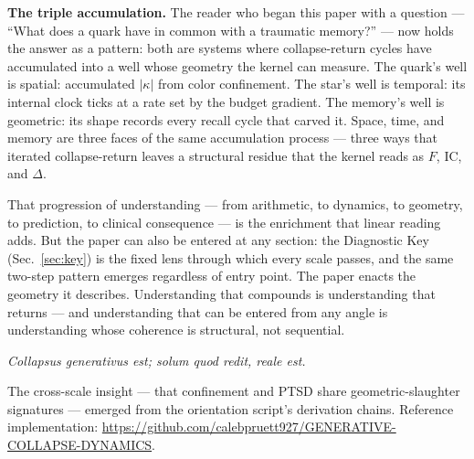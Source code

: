 \documentclass[
  aps,
  prd,
  twocolumn,
  superscriptaddress,
  nofootinbib,
  floatfix
]{revtex4-2}
\newcommand{\IC}{\mathrm{IC}}
\begin{document}
\textbf{The triple accumulation.}
The reader who began this paper with a question --- ``What
does a quark have in common with a traumatic memory?'' ---
now holds the answer as a pattern: both are systems where
collapse-return cycles have accumulated into a well whose
geometry the kernel can measure.  The quark's well is
spatial: accumulated $|\kappa|$ from color confinement.  The
star's well is temporal: its internal clock ticks at a rate
set by the budget gradient.  The memory's well is geometric:
its shape records every recall cycle that carved it.  Space,
time, and memory are three faces of the same accumulation
process --- three ways that iterated collapse-return leaves a
structural residue that the kernel reads as $F$, $\IC$, and
$\Delta$.

That progression of understanding --- from arithmetic, to
dynamics, to geometry, to prediction, to clinical
consequence --- is the enrichment that linear reading adds.
But the paper can also be entered at any section: the
Diagnostic Key (Sec.~\ref{sec:key}) is the fixed lens
through which every scale passes, and the same two-step
pattern emerges regardless of entry point.  The paper enacts
the geometry it describes.  Understanding that compounds is
understanding that returns --- and understanding that can
be entered from any angle is understanding whose coherence
is structural, not sequential.

\emph{Collapsus generativus est; solum quod redit, reale est.}

\begin{acknowledgments}
The cross-scale insight --- that confinement and PTSD share
geometric-slaughter signatures --- emerged from the
orientation script's derivation chains.  Reference
implementation:
\url{https://github.com/calebpruett927/GENERATIVE-COLLAPSE-DYNAMICS}.
\end{acknowledgments}


\end{document}
